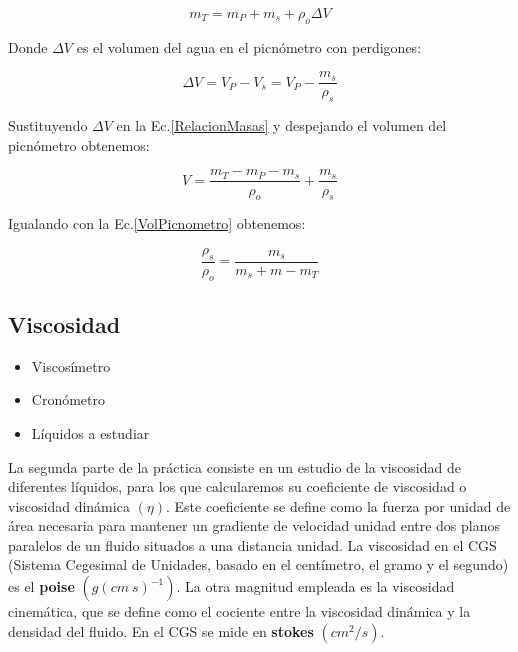\documentclass[a4paper,12pt,titlepage]{article}
\begin{document}
\begin{itemize}
        \begin{equation}
            m_{T}=m_{P}+m_{s}+\rho_{o} \Delta V
            \label{RelacionMasas}
        \end{equation}
    
    Donde $\Delta V$ es el volumen del agua en el picnómetro con perdigones:

        \begin{equation}
            \Delta V = V_{P}-V_{s}=V_{P}-\frac{m_{s}}{\rho_{s}}
        \end{equation}

    Sustituyendo $\Delta V$ en la Ec.\ref{RelacionMasas} y despejando el volumen del picnómetro obtenemos:

    \begin{equation}
        V = \frac{m_{T}-m_{P}-m_{s}}{\rho_{o}}+\frac{m_{s}}{\rho_{s}}
    \end{equation}

    Igualando con la Ec.\ref{VolPicnometro} obtenemos:

    \begin{equation}
        \frac{\rho_{s}}{\rho_{o}}=\frac{m_{s}}{m_{s}+m-m_{T}}
        \label{Densidad Sólido}
    \end{equation}

    
\end{itemize}



\subsection{Viscosidad}

\begin{itemize}
    \item Viscosímetro
    \item Cronómetro
    \item Líquidos a estudiar
\end{itemize}

La segunda parte de la práctica consiste en un estudio de la viscosidad de diferentes líquidos, para los que calcularemos su coeficiente de viscosidad o viscosidad dinámica $(\eta )$. Este coeficiente se define como la fuerza por unidad de área necesaria para mantener un gradiente de velocidad unidad entre dos planos paralelos de un fluido situados a una distancia unidad. La viscosidad en el CGS (Sistema Cegesimal de Unidades, basado en el centímetro, el gramo y el segundo) es el \textbf{poise} $(g(cm\: s)^{-1})$. La otra magnitud empleada es la viscosidad cinemática, que se define como el cociente entre la viscosidad dinámica y la densidad del fluido. En el CGS se mide en \textbf{stokes} $(cm^2/s)$.
\end{document}
